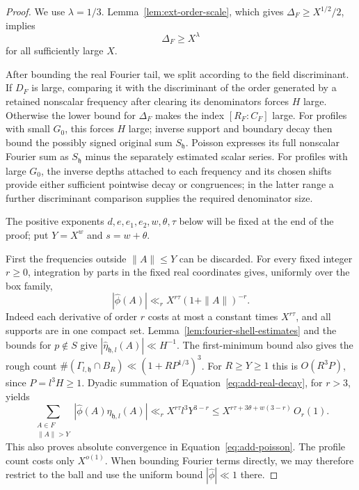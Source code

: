 \begin{proof}
We use \(\lambda=1/3\).  Lemma~\ref{lem:ext-order-scale}, which gives
\(\Delta_F\ge X^{1/2}/2\), implies
\begin{equation}
 \Delta_F\ge X^\lambda
 \label{eq:add-order-lower}
\end{equation}
for all sufficiently large \(X\).

After bounding the real Fourier tail, we split according to the field
discriminant.  If \(D_F\) is large, comparing it with the discriminant of
the order generated by a retained nonscalar frequency after clearing its
denominators forces \(H\) large.  Otherwise the lower bound for
\(\Delta_F\) makes the index \([R_F:C_F]\) large.  For profiles with small
\(G_0\), this forces \(H\) large; inverse support and boundary decay then
bound the possibly signed original sum \(S_{\mathfrak h}\).  Poisson
expresses its full nonscalar Fourier sum as \(S_{\mathfrak h}\) minus the
separately estimated scalar series.  For profiles with large \(G_0\), the
inverse depths attached to each frequency and its chosen shifts provide
either sufficient pointwise decay or congruences; in the latter range a
further discriminant comparison supplies the required denominator size.

The positive exponents
\(d,e,e_1,e_2,w,\theta,\tau\) below will be fixed at the end of the proof;
put \(Y=X^w\) and \(s=w+\theta\).

First the frequencies outside \(\|A\|\le Y\) can be discarded.  For every
fixed integer \(r\ge0\), integration by parts in the fixed real coordinates
gives, uniformly over the box family,
\begin{equation}
 |\widehat\phi(A)|\ll_r
       X^{r\tau}(1+\|A\|)^{-r}.
 \label{eq:add-real-decay}
\end{equation}
Indeed each derivative of order \(r\) costs at most a constant times
\(X^{r\tau}\), and all supports are in one compact set.
Lemma~\ref{lem:fourier-shell-estimates} and the bounds for \(p\notin S\) give
\(|\widehat\eta_{\mathfrak h,l}(A)|\ll H^{-1}\).
The first-minimum bound also gives the rough count
\(\#(\Gamma_{l,\mathfrak h}\cap B_R)\ll(1+RP^{1/3})^3\).
For \(R\ge Y\ge1\) this is \(O(R^3P)\), since \(P=l^3H\ge1\).
Dyadic summation of Equation~\eqref{eq:add-real-decay}, for \(r>3\), yields
\begin{equation}
 \sum_{\substack{A\in F\\\|A\|>Y}}
   |\widehat\phi(A)\widehat\eta_{\mathfrak h,l}(A)|
  \ll_r X^{r\tau}l^3Y^{3-r}
  \le X^{r\tau+3\theta+w(3-r)}\,O_r(1).
 \label{eq:add-real-tail}
\end{equation}
This also proves absolute convergence in Equation~\eqref{eq:add-poisson}.
The profile count costs only \(X^{o(1)}\).  When bounding Fourier terms
directly, we may therefore restrict to the ball and use the uniform bound
\(|\widehat\phi|\ll1\) there.


\end{proof}
